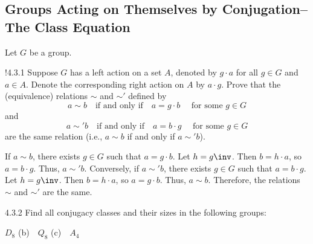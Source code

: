 \subsection{Groups Acting on Themselves by Conjugation--The Class Equation}

Let $G$ be a group.

\begin{exercise}!{4.3.1}
	Suppose $G$ has a left action on a set $A$, denoted by $g \cdot a$ for all $g \in G$ and $a \in A$.
	Denote the corresponding right action on $A$ by $a \cdot g$.
	Prove that the (equivalence) relations $\sim$ and $\sim'$ defined by
	\[
		 a \sim b \quad \text{if and only if} \quad a = g \cdot b \quad \text{ for some } g \in G 
	\]
	and
	\[
		 a \sim' b \quad \text{if and only if} \quad a = b \cdot g \quad \text{ for some } g \in G 
	\]
	are the same relation (i.e., $a \sim b$ if and only if $a \sim' b$).
\end{exercise}

\begin{sol}
	If $a \sim b$, there exists $g \in G$ such that $a = g \cdot b$.
	Let $h = g\inv$.
	Then $b = h \cdot a$, so $a = b \cdot g$.
	Thus, $a \sim' b$.
	Conversely, if $a \sim' b$, there exists $g \in G$ such that $a = b \cdot g$.
	Let $h = g\inv$.
	Then $b = h \cdot a$, so $a = g \cdot b$.
	Thus, $a \sim b$.
	Therefore, the relations $\sim$ and $\sim'$ are the same.
\end{sol}

\begin{exercise}{4.3.2}
	 Find all conjugacy classes and their sizes in the following groups:
	\begin{subexercises}
		\item $D_8$ \quad (b)~~$Q_8$ \quad (c)~~$A_4$
	\end{subexercises}
\end{exercise}

